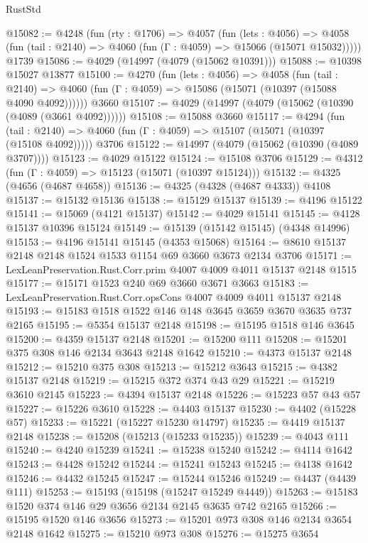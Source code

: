 \begin{lexlean}{RustStd}
\begin{coremodule}
@15082 := @4248
    (fun (rty : @1706) =>
    @4057
      (fun (lets : @4056) =>
      @4058 (fun (tail : @2140) => @4060 (fun (Γ : @4059) => @15066 (@15071 @15032)))))
    @1739
@15086 := @4029 (@14997 (@4079 (@15062 @10391)))
@15088 := @10398 @15027 @13877
@15100 := @4270
    (fun (lets : @4056) =>
    @4058
      (fun (tail : @2140) =>
      @4060 (fun (Γ : @4059) => @15086 (@15071 (@10397 (@15088 @4090 @4092))))))
    @3660
@15107 := @4029 (@14997 (@4079 (@15062 (@10390 (@4089 (@3661 @4092))))))
@15108 := @15088 @3660
@15117 := @4294
    (fun (tail : @2140) => @4060 (fun (Γ : @4059) => @15107 (@15071 (@10397 (@15108 @4092)))))
    @3706
@15122 := @14997 (@4079 (@15062 (@10390 (@4089 @3707))))
@15123 := @4029 @15122
@15124 := @15108 @3706
@15129 := @4312 (fun (Γ : @4059) => @15123 (@15071 (@10397 @15124)))
@15132 := @4325 (@4656 (@4687 @4658))
@15136 := @4325 (@4328 (@4687 @4333)) @4108
@15137 := @15132 @15136
@15138 := @15129 @15137
@15139 := @4196 @15122
@15141 := @15069 (@4121 @15137)
@15142 := @4029 @15141
@15145 := @4128 @15137 @10396 @15124
@15149 := @15139 (@15142 @15145) (@4348 @14996)
@15153 := @4196 @15141 @15145 (@4353 @15068)
@15164 := @8610 @15137 @2148 @2148 @1524 @1533 @1154 @69 @3660 @3673 @2134 @3706
@15171 := LexLeanPreservation.Rust.Corr.prim @4007 @4009 @4011 @15137 @2148 @1515
@15177 := @15171 @1523 @240 @69 @3660 @3671 @3663
@15183 := LexLeanPreservation.Rust.Corr.opsCons @4007 @4009 @4011 @15137 @2148
@15193 := @15183 @1518 @1522 @146 @148 @3645 @3659 @3670 @3635 @737 @2165
@15195 := @5354 @15137 @2148
@15198 := @15195 @1518 @146 @3645
@15200 := @4359 @15137 @2148
@15201 := @15200 @111
@15208 := @15201 @375 @308 @146 @2134 @3643 @2148 @1642
@15210 := @4373 @15137 @2148
@15212 := @15210 @375 @308
@15213 := @15212 @3643
@15215 := @4382 @15137 @2148
@15219 := @15215 @372 @374 @43 @29
@15221 := @15219 @3610 @2145
@15223 := @4394 @15137 @2148
@15226 := @15223 @57 @43 @57
@15227 := @15226 @3610
@15228 := @4403 @15137
@15230 := @4402 (@15228 @57)
@15233 := @15221 (@15227 @15230 @14797)
@15235 := @4419 @15137 @2148
@15238 := @15208 (@15213 (@15233 @15235))
@15239 := @4043 @111
@15240 := @4240 @15239
@15241 := @15238 @15240
@15242 := @4114 @1642
@15243 := @4428 @15242
@15244 := @15241 @15243
@15245 := @4138 @1642
@15246 := @4432 @15245
@15247 := @15244 @15246
@15249 := @4437 (@4439 @111)
@15253 := @15193 (@15198 (@15247 @15249 @4449))
@15263 := @15183 @1520 @374 @146 @29 @3656 @2134 @2145 @3635 @742 @2165
@15266 := @15195 @1520 @146 @3656
@15273 := @15201 @973 @308 @146 @2134 @3654 @2148 @1642
@15275 := @15210 @973 @308
@15276 := @15275 @3654

\end{coremodule}
\end{lexlean}
